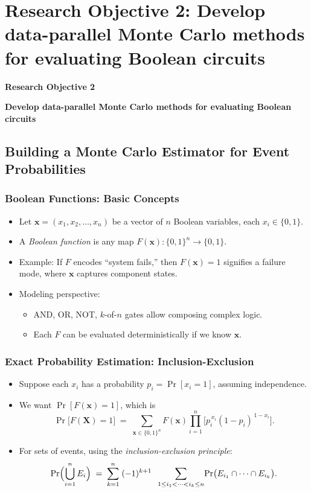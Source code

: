 

\section{Research Objective 2: Develop data-parallel Monte Carlo methods for evaluating Boolean circuits}
\begin{frame}
    \Large{\centerline{\textbf{Research Objective 2}}}
    \vspace{6pt}
    \large{\centerline{\textbf{Develop data-parallel Monte Carlo methods for evaluating Boolean circuits}}}
\end{frame}

\subsection{Building a Monte Carlo Estimator for Event Probabilities}
\begin{frame}[t, allowframebreaks]
\frametitle{Boolean Functions: Basic Concepts}
\begin{itemize}
  \item Let \(\mathbf{x} = (x_1, x_2, \dots, x_n)\) be a vector of \(n\) Boolean variables, each \(x_i \in \{0,1\}\).
  \item A \emph{Boolean function} is any map \(F(\mathbf{x}): \{0,1\}^n \to \{0,1\}\).
  \item Example: If \(F\) encodes “system fails,” then \(F(\mathbf{x}) = 1\) signifies a failure mode, where \(\mathbf{x}\) captures component states.
  \item Modeling perspective:
    \begin{itemize}
      \item AND, OR, NOT, \(k\)-of-\(n\) gates allow composing complex logic.  
      \item Each \(F\) can be evaluated deterministically if we know \(\mathbf{x}\).
    \end{itemize}
\end{itemize}
\end{frame}

\begin{frame}[t, allowframebreaks]
\frametitle{Exact Probability Estimation: Inclusion-Exclusion}
\begin{itemize}
  \item Suppose each \(x_i\) has a probability \(p_i = \Pr[x_i=1]\), assuming independence.
  \item We want \(\Pr[F(\mathbf{x}) = 1]\), which is
  \[
    \Pr\bigl[F(\mathbf{X})=1\bigr]
    \;=\; 
    \sum_{\mathbf{x}\in \{0,1\}^n}
      F(\mathbf{x}) 
      \prod_{i=1}^n
      \bigl[p_i^{\,x_i}(1-p_i)^{\,1-x_i}\bigr].
  \]
  \item For sets of events, using the \emph{inclusion-exclusion principle}:
  \[
    \Pr\Bigl(\bigcup_{i=1}^n E_i\Bigr)
    \;=\;
    \sum_{k=1}^n \;(-1)^{k+1} 
    \;\;\sum_{1\le i_1< \cdots < i_k\le n}
    \!\Pr\bigl(E_{i_1}\cap\dots\cap E_{i_k}\bigr).
  \]

\end{itemize}
\end{frame}

